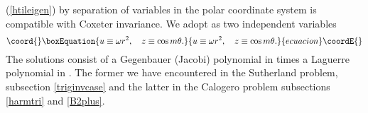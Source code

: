 \documentclass[a4paper,12pt]{article}
\begin{document}
(\ref{htileigen}) by
separation of variables in the polar coordinate system is
compatible with Coxeter
invariance.
We adopt as two independent variables
\begin{equation}\coord{}\boxEquation{
   u\equiv\omega r^2,\quad z\equiv\cos m\theta.
   \label{coxinvvartwo}
}{
   u\equiv\omega r^2,\quad z\equiv\cos m\theta.
   }{ecuacion}\coordE{}\end{equation}
The solutions consist of a Gegenbauer (Jacobi) polynomial in
\coordHE{}
times a Laguerre polynomial in \coordHE{}.
The former we have encountered in the \coordHE{} Sutherland problem, subsection
\ref{triginvcase} and the latter in the \coordHE{} Calogero problem subsections
\ref{harmtri} and \ref{B2plus}.
\end{document}
